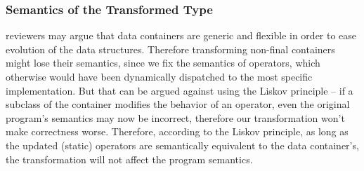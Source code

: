 \subsubsection{Semantics of the Transformed Type}
reviewers may argue that data containers are generic and flexible in order to ease evolution of the data structures. Therefore transforming non-final containers might lose their semantics, since we fix the semantics of operators, which otherwise would have been dynamically dispatched to the most specific implementation. But that can be argued against using the Liskov principle -- if a subclass of the container modifies the behavior of an operator, even the original program's semantics may now be incorrect, therefore our transformation won't make correctness worse. Therefore, according to the Liskov principle, as long as the updated (static) operators are semantically equivalent to the data container's, the transformation will not affect the program semantics.

